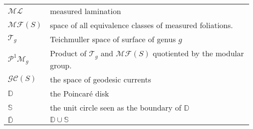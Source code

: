 \begin{tabular}{ll}
  $\mathcal{ML}$ &  measured lamination  \\
  $\mathcal{MF}(S)$ & space of all equivalence classes of measured foliations. \\
  $\mathcal{T}_g$ & Teichmuller space of surface of genus $g$ \\
  $\mathcal{P}^1 \mathcal{M}_g$ & Product of $\mathcal{T}_g$  and $\mathcal{MF}(S)$ quotiented by the modular group. \\
$\mathcal{GC}(S)$  & the space of geodesic currents \\
$\mathbb{D}$ & the Poincaré disk \\
$\mathbb{S}$ & the unit circle seen as the boundary of $\mathbb{D}$ \\
$\bar{\mathbb{D}}$ & $\mathbb{D} \cup \mathbb{S}$
\end{tabular}

